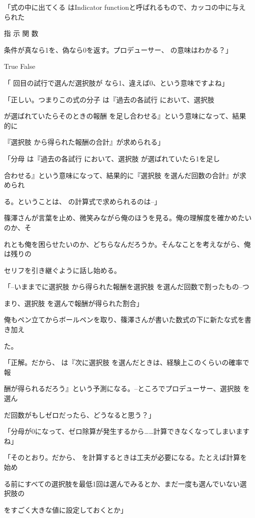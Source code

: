 「式の中に出てくる はIndicator functionと呼ばれるもので、カッコの中に与えられた\par
指 ⽰ 関 数\par
条件が真なら1を、偽なら0を返す。プロデューサー、 の意味はわかる？」\par
True False\par
「 回⽬の試⾏で選んだ選択肢が なら1、違えば0、という意味ですよね」\par
「正しい。つまりこの式の分⼦ は『過去の各試⾏ において、選択肢\par
が選ばれていたらそのときの報酬 を⾜し合わせる』という意味になって、結果的に\par
『選択肢 から得られた報酬の合計』が求められる」\par
「分母 は『過去の各試⾏ において、選択肢 が選ばれていたら1を⾜し\par
合わせる』という意味になって、結果的に『選択肢 を選んだ回数の合計』が求められ\par
る。ということは、 の計算式で求められるのは--」\par
篠澤さんが⾔葉を⽌め、微笑みながら俺のほうを⾒る。俺の理解度を確かめたいのか、そ\par
れとも俺を困らせたいのか、どちらなんだろうか。そんなことを考えながら、俺は残りの\par
セリフを引き継ぐように話し始める。\par
「--いままでに選択肢 から得られた報酬を選択肢 を選んだ回数で割ったもの--つ\par
まり、選択肢 を選んで報酬が得られた割合」\par
俺もペン⽴てからボールペンを取り、篠澤さんが書いた数式の下に新たな式を書き加え\par
た。\par
「正解。だから、 は『次に選択肢 を選んだときは、経験上このくらいの確率で報\par
酬が得られるだろう』という予測になる。--ところでプロデューサー、選択肢 を選ん\par
だ回数がもしゼロだったら、どうなると思う？」\par
「分母が0になって、ゼロ除算が発⽣するから……計算できなくなってしまいますね」\par
「そのとおり。だから、 を計算するときは⼯夫が必要になる。たとえば計算を始め\par
る前にすべての選択肢を最低1回は選んでみるとか、まだ⼀度も選んでいない選択肢の\par
をすごく⼤きな値に設定しておくとか」\par
